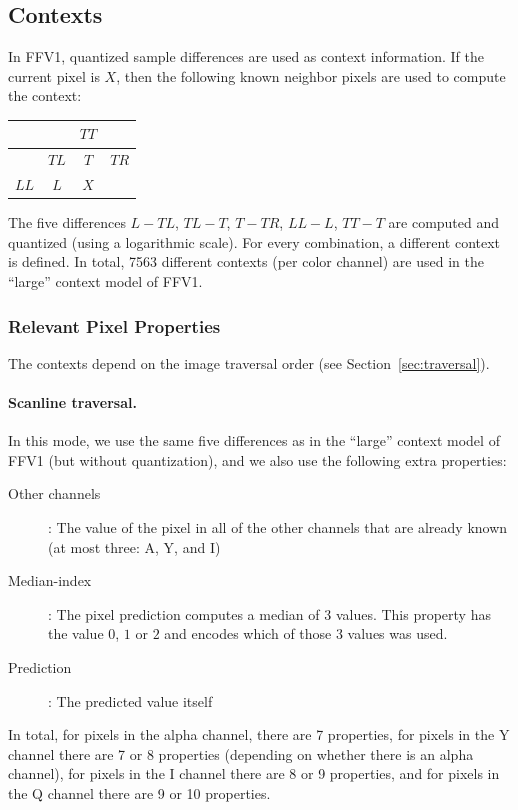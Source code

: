 \documentclass[a4paper,USenglish]{lipics}
\begin{document}
\subsection{Contexts}

In FFV1, quantized sample differences are used as context information.
If the current pixel is $X$, then the following known neighbor pixels are used to compute the
context:
\begin{center}
\begin{tabular}{|c|c|c|c|}
\hline
  & & $TT$ & \\
\hline
  & $TL$ & $T$ & $TR$ \\
\hline
$LL$ & $L$ & $X$ & \\
\hline
\end{tabular}
\end{center}

The five differences $L-TL$, $TL-T$, $T-TR$, $LL-L$, $TT-T$ are computed and quantized (using
a logarithmic scale).
For every combination, a different context is defined.
In total, 7563 different contexts (per color channel) are used in the ``large'' context model of FFV1.


\subsubsection{Relevant Pixel Properties}

The contexts depend on the image traversal order (see Section~\ref{sec:traversal}).

\paragraph{Scanline traversal.}
In this mode, we use the same five differences as in the ``large'' context model of FFV1 (but without quantization),
and we also use the following extra properties:
\begin{description}
\item[Other channels]: The value of the pixel in all of the other channels that are already known (at most three: A, Y, and I)
\item[Median-index]: The pixel prediction computes a median of 3 values. This property has the value $0$, $1$ or $2$ and encodes which of those 3 values was used.
\item[Prediction]: The predicted value itself
\end{description}
In total, for pixels in the alpha channel, there are 7 properties, for pixels in the Y channel there are 7 or 8 properties
(depending on whether there is an alpha channel), for pixels in the I channel there are 8 or 9 properties, and for pixels
in the Q channel there are 9 or 10 properties.
\end{document}

